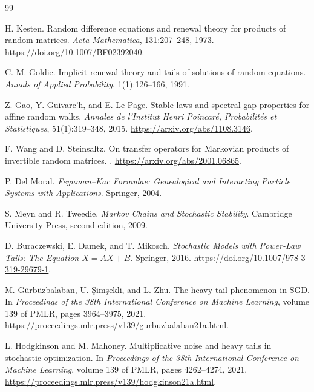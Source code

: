 \documentclass[11pt]{article}
\theoremstyle{definition}
\begin{document}
\clearpage
\begin{thebibliography}{99}

H. Kesten.
\newblock Random difference equations and renewal theory for products of
random matrices.
\newblock \emph{Acta Mathematica}, 131:207--248, 1973.
\newblock \url{https://doi.org/10.1007/BF02392040}.

C. M. Goldie.
\newblock Implicit renewal theory and tails of solutions of random equations.
\newblock \emph{Annals of Applied Probability}, 1(1):126--166, 1991.

Z. Gao, Y. Guivarc'h, and E. Le Page.
\newblock Stable laws and spectral gap properties for affine random walks.
\newblock \emph{Annales de l'Institut Henri Poincar\'e, Probabilit\'es et
Statistiques}, 51(1):319--348, 2015.
\newblock \url{https://arxiv.org/abs/1108.3146}.

F. Wang and D. Steinsaltz.
\newblock On transfer operators for Markovian products of invertible random
matrices.
.
\newblock \url{https://arxiv.org/abs/2001.06865}.

P. Del Moral.
\newblock \emph{Feynman--Kac Formulae: Genealogical and Interacting Particle
Systems with Applications}.
\newblock Springer, 2004.

S. Meyn and R. Tweedie.
\newblock \emph{Markov Chains and Stochastic Stability}.
\newblock Cambridge University Press, second edition, 2009.

D. Buraczewski, E. Damek, and T. Mikosch.
\newblock \emph{Stochastic Models with Power-Law Tails: The Equation
$X=AX+B$}.
\newblock Springer, 2016.
\newblock \url{https://doi.org/10.1007/978-3-319-29679-1}.

M. G\"urb\"uzbalaban, U. \c{S}im\c{s}ekli, and L. Zhu.
\newblock The heavy-tail phenomenon in SGD.
\newblock In \emph{Proceedings of the 38th International Conference on
Machine Learning}, volume 139 of PMLR, pages 3964--3975, 2021.
\newblock \url{https://proceedings.mlr.press/v139/gurbuzbalaban21a.html}.

L. Hodgkinson and M. Mahoney.
\newblock Multiplicative noise and heavy tails in stochastic optimization.
\newblock In \emph{Proceedings of the 38th International Conference on
Machine Learning}, volume 139 of PMLR, pages 4262--4274, 2021.
\newblock \url{https://proceedings.mlr.press/v139/hodgkinson21a.html}.


\end{thebibliography}
\end{document}
